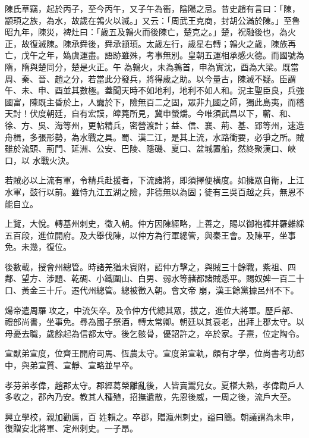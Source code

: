 \begin{pinyinscope}
 陳氏草竊，起於丙子，至今丙午，又子午為衝，陰陽之忌。昔史趙有言曰：「陳，顓頊之族，為水，故歲在鶉火以滅。」又云：「周武王克商，封胡公滿於陳。」至魯昭九年，陳災，裨灶曰：「歲五及鶉火而後陳亡，楚克之。」楚，祝融後也，為火正，故復滅陳。陳承舜後，舜承顓頊。太歲左行，歲星右轉；鶉火之歲，陳族再亡，戊午之年，媯虞運盡。語跡雖殊，考事無別。皇朝五運相承感火德。而國號為隋，隋與楚同分，楚是火正。午
 為鶉火，未為鶉首，申為實沈，酉為大梁。既當周、秦、晉、趙之分，若當此分發兵，將得歲之助。以今量古，陳滅不疑。臣謂午、未、申、酉並其數極。蓋聞天時不如地利，地利不如人和。況主聖臣良，兵強國富，陳既主昏於上，人讟於下，險無百二之固，眾非九國之師，獨此島夷，而稽天討！伏度朝廷，自有宏謨，皞蕘所見，冀申螢爝。今唯須武昌以下，蘄、和、徐、方、吳、海等州，更帖精兵，密營渡計；益、信、襄、荊、基、郢等州，速造舟楫，多張形勢，為水戰之具。蜀、漢二江，是其上流，水路衝要，必爭之所。賊雖於流頭、荊門、延洲、公安、巴陵、隱磯、夏口、盆城置船，然終聚漢口、峽口，以
 水戰火決。



 若賊必以上流有軍，令精兵赴援者，下流諸將，即須擇便橫度。如擁眾自衛，上江水軍，鼓行以前。雖恃九江五湖之險，非德無以為固；徒有三吳百越之兵，無恩不能自立。



 上覽，大悅。轉基州刺史，徵入朝。仲方因陳經略，上善之，賜以御袍褲并羅雜綵五百段，進位開府。及大舉伐陳，以仲方為行軍總管，與秦王會。及陳平，坐事免。未幾，復位。



 後數載，授會州總管。時諸羌猶未賓附，詔仲方擊之，與賊三十餘戰，紫祖、四鄰、望方、涉題、乾碉、小鐵圍山、白男、弱水等赭都諸賊悉平。賜奴婢一百二十口、黃金三十斤。遷代州總管。總被徵入朝。會文帝
 崩，漢王餘黨據呂州不下。



 煬帝遣周羅攻之，中流矢卒。及令仲方代總其眾，拔之，進位大將軍。歷戶部、禮部尚書，坐事免。尋為國子祭酒，轉太常卿。朝廷以其衰老，出拜上郡太守。以母憂去職，歲餘起為信都太守。後乞骸骨，優詔許之，卒於家。子燾，位定陶令。



 宣猷弟宣度，位齊王開府司馬、恆農太守。宣度弟宣軌，頗有才學，位尚書考功郎中，與弟宣質、宣靜、宣略並早卒。



 孝芬弟孝偉，趙郡太守。郡經葛榮離亂後，人皆賣鬻兒女。夏椹大熟，孝偉勸戶人多收之，郡內乃安。教其人種殖，招撫遺散，先恩後威，一周之後，流戶大至。



 興立學校，親加勸厲，百
 姓賴之。卒郡，贈瀛州刺史，謚曰簡。朝議謂為未申，復贈安北將軍、定州刺史。一子昂。




\end{pinyinscope}
